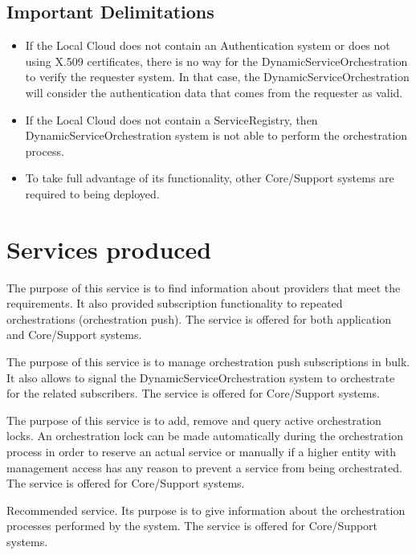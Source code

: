 \documentclass[a4paper]{arrowhead}
\begin{document}
\subsection{Important Delimitations}
\label{sec:delimitations}

\begin{itemize}
    \item If the Local Cloud does not contain an Authentication system or does not using X.509 certificates, there is no way for the DynamicServiceOrchestration to verify the requester system. In that case, the DynamicServiceOrchestration will consider the authentication data that comes from the requester as valid.
    \item If the Local Cloud does not contain a ServiceRegistry, then DynamicServiceOrchestration system is not able to perform the orchestration process.
    \item To take full advantage of its functionality, other Core/Support systems are required to being deployed.
\end{itemize} 

\newpage

\section{Services produced}
\label{sec:services}

The purpose of this service is to find information about providers that meet the requirements. It also provided subscription functionality to repeated orchestrations (orchestration push). The service is offered for both application and Core/Support systems. 

The purpose of this service is to manage orchestration push subscriptions in bulk. It also allows to signal the DynamicServiceOrchestration system to orchestrate for the related subscribers. The service is offered for Core/Support systems. 

The purpose of this service is to add, remove and query active orchestration locks. An orchestration lock can be made automatically during the orchestration process in order to reserve an actual service or manually if a higher entity with management access has any reason to prevent a service from being orchestrated. The service is offered for Core/Support systems.

Recommended service. Its purpose is to give information about the orchestration processes performed by the system. The service is offered for Core/Support systems.
\end{document}
